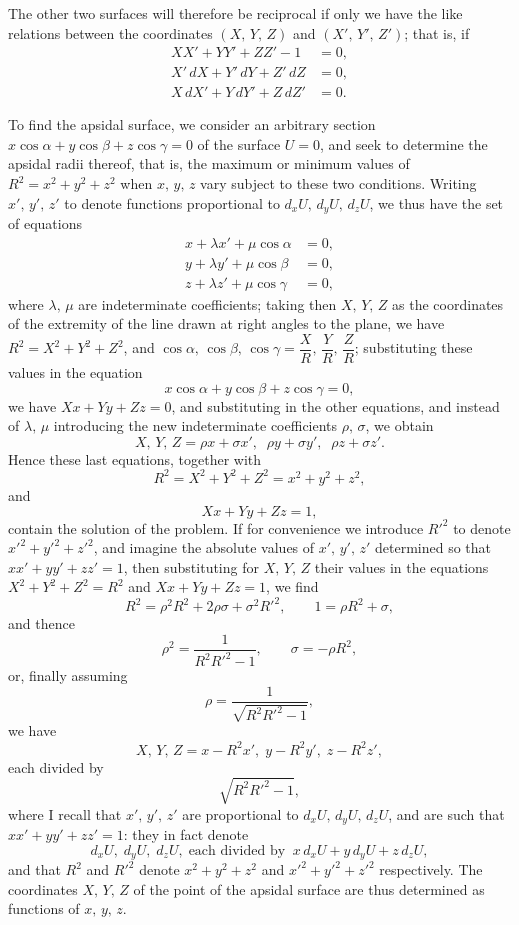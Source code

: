 \documentclass[11pt]{article}
\begin{document}
The other two surfaces will therefore be reciprocal if only we have the like
relations between the coordinates $(X,\,Y,\,Z)$ and $(X',\,Y',\,Z')$; that is, if
\begin{align*}
XX' + YY' + ZZ' - 1 &= 0,\\
X'\,dX + Y'\,dY + Z'\,dZ &= 0,\\
X\,dX' + Y\,dY' + Z\,dZ' &= 0.
\end{align*}

To find the apsidal surface, we consider an arbitrary section $x\cos\alpha + y\cos\beta + z\cos\gamma = 0$
of the surface $U = 0$, and seek to determine the apsidal radii thereof, that is, the
maximum or minimum values of $R^2 = x^2 + y^2 + z^2$ when $x,\,y,\,z$ vary subject to these
two conditions. Writing $x',\,y',\,z'$ to denote functions proportional to $d_x U,\,d_y U,\,d_z U$,
we thus have the set of equations
\begin{align*}
x + \lambda x' + \mu \cos\alpha &= 0,\\
y + \lambda y' + \mu \cos\beta  &= 0,\\
z + \lambda z' + \mu \cos\gamma &= 0,
\end{align*}
where $\lambda,\,\mu$ are indeterminate coefficients; taking then $X,\,Y,\,Z$ as the coordinates of
the extremity of the line drawn at right angles to the plane, we have $R^2 = X^2 + Y^2 + Z^2$,
and $\cos\alpha,\,\cos\beta,\,\cos\gamma = \dfrac{X}{R},\,\dfrac{Y}{R},\,\dfrac{Z}{R}$; substituting these values in the equation
\[
   x\cos\alpha + y\cos\beta + z\cos\gamma = 0,
\]
we have $Xx + Yy + Zz = 0$, and substituting in the other equations, and instead of
$\lambda,\,\mu$ introducing the new indeterminate coefficients $\rho,\,\sigma$, we obtain
\[
   X,\,Y,\,Z = \rho x + \sigma x',\;\;\rho y + \sigma y',\;\;\rho z + \sigma z'.
\]
Hence these last equations, together with
\[
   R^2 = X^2 + Y^2 + Z^2 = x^2 + y^2 + z^2,
\]
and
\[
   Xx + Yy + Zz = 1,
\]
contain the solution of the problem. If for convenience we introduce $R'^2$ to denote
$x'^2 + y'^2 + z'^2$, and imagine the absolute values of $x',\,y',\,z'$ determined so that $xx' + yy' + zz' = 1$,
then substituting for $X,\,Y,\,Z$ their values in the equations $X^2 + Y^2 + Z^2 = R^2$ and
$Xx + Yy + Zz = 1$, we find
\[
   R^2 = \rho^2 R^2 + 2\rho\sigma + \sigma^2 R'^2,\qquad 1 = \rho R^2 + \sigma,
\]
and thence
\[
   \rho^2 = \frac{1}{R^2 R'^2 - 1},\qquad \sigma = -\rho R^2,
\]
or, finally assuming
\[
   \rho = \frac{1}{\sqrt{R^2 R'^2 - 1}},
\]
we have
\[
   X,\,Y,\,Z = x - R^2 x',\; y - R^2 y',\; z - R^2 z',
\]
each divided by
\[
   \sqrt{R^2 R'^2 - 1},
\]
where I recall that $x',\,y',\,z'$ are proportional to $d_x U,\,d_y U,\,d_z U$, and are such that
$xx' + yy' + zz' = 1$: they in fact denote
\[
   d_x U,\;d_y U,\;d_z U,\;\text{each divided by}\;\; x\,d_x U + y\,d_y U + z\,d_z U,
\]
and that $R^2$ and $R'^2$ denote $x^2 + y^2 + z^2$ and $x'^2 + y'^2 + z'^2$ respectively. The coordinates
$X,\,Y,\,Z$ of the point of the apsidal surface are thus determined as functions of $x,\,y,\,z$.
\end{document}
